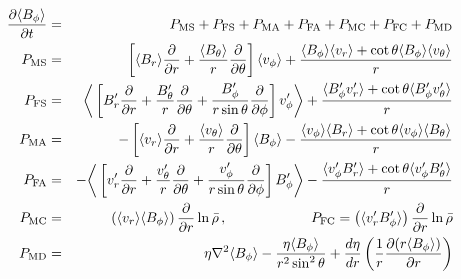 \begin{eqnarray}\label{eq:ind3pe}
 \frac{\partial \langle B_{\phi} \rangle }{\partial t} &=&
             P_\mathrm{MS} + P_\mathrm{FS}  
	   + P_\mathrm{MA} + P_\mathrm{FA} 
	   + P_\mathrm{MC} + P_\mathrm{FC}
	   + P_\mathrm{MD} \nonumber\\
%
\label{eq:MS phi}
P_\mathrm{MS} &=& \phn\advbm  \langle v_{\phi} \rangle  + \frac{ \langle B_{\phi} \rangle  \langle v_r \rangle  + \cot\theta  \langle B_{\phi} \rangle  \langle v_{\theta} \rangle }{r}\\
\label{eq:FS phi}
P_\mathrm{FS} &=& \phn\bigg\langle \advbf v_{\phi}' \bigg\rangle  + \frac{ \langle B_{\phi}'v_r' \rangle  + \cot\theta  \langle B_{\phi}'v_{\theta}' \rangle }{r}\\
\label{eq:MA phi}
P_\mathrm{MA} &=& -\advvm  \langle B_{\phi} \rangle  - \frac{ \langle v_{\phi} \rangle  \langle B_r \rangle  + \cot\theta  \langle v_{\phi} \rangle  \langle B_{\theta} \rangle }{r}  \\
\label{eq:FA phi}
P_\mathrm{FA} &=& -\bigg\langle \advvf B_{\phi}' \bigg\rangle  - \frac{ \langle v_{\phi}'B_r' \rangle  + \cot\theta  \langle v_{\phi}'B_{\theta}' \rangle }{r} \\
\label{eq:MC phi}
P_\mathrm{MC} &=& \phn\left(\langle v_r \rangle  \langle B_{\phi} \rangle\right)\frac{\p}{\p r}\ln \rb \thinspace, \qquad\qquad \qquad%
\label{eq:FC phi}
P_\mathrm{FC} = \left(\langle v_r'B_{\phi}' \rangle \right)\frac{\p}{\p r}\ln \rb\\
\label{eq:MD phi}
P_\mathrm{MD} &=& \phn\eta\nabla^{2} \langle B_{\phi} \rangle -\frac{\eta  \langle B_{\phi} \rangle }{r^2\sin^2\theta}+\frac{d\eta}{dr}\left(\frac{1}{r}\frac{\p (r \langle B_{\phi} \rangle )}{\p r} \right) 
\end{eqnarray}



